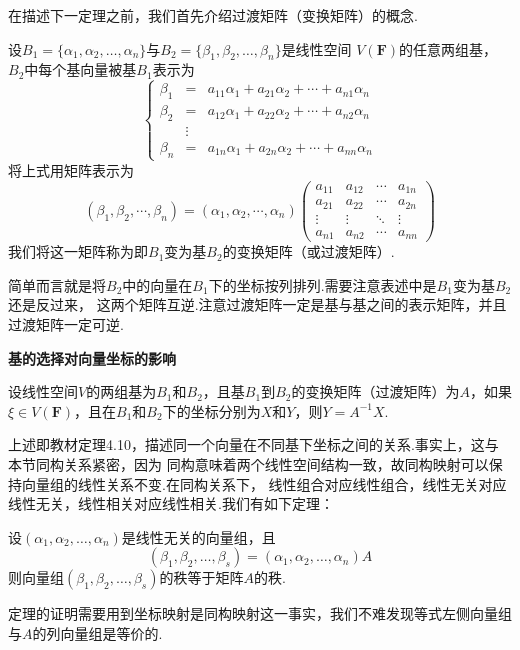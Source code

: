在描述下一定理之前，我们首先介绍过渡矩阵（变换矩阵）的概念.
\begin{definition}
    设$B_1=\{\alpha_1,\alpha_2,\ldots,\alpha_n\}$与$B_2=\{\beta_1,\beta_2,\ldots,\beta_n\}$是线性空间
    $V(\mathbf{F})$的任意两组基，$B_2$中每个基向量被基$B_1$表示为
    \[ \left\{
    \begin{array}{rcl}
        \beta_1&=&a_{11}\alpha_1+a_{21}\alpha_2+\cdots+a_{n1}\alpha_n \\
        \beta_2&=&a_{12}\alpha_1+a_{22}\alpha_2+\cdots+a_{n2}\alpha_n \\
        &\vdots& \\
        \beta_n&=&a_{1n}\alpha_1+a_{2n}\alpha_2+\cdots+a_{nn}\alpha_n
    \end{array}
    \right. \]
    将上式用矩阵表示为
    \[(\beta_1,\beta_2,\cdots,\beta_n)=(\alpha_1,\alpha_2,\cdots,\alpha_n)\begin{pmatrix}
        a_{11} & a_{12} & \cdots & a_{1n} \\
        a_{21} & a_{22} & \cdots & a_{2n} \\
        \vdots & \vdots & \ddots & \vdots \\
        a_{n1} & a_{n2} & \cdots & a_{nn}
    \end{pmatrix}\]
    我们将这一矩阵称为即$B_1$变为基$B_2$的变换矩阵（或过渡矩阵）.
\end{definition}
简单而言就是将$B_2$中的向量在$B_1$下的坐标按列排列.需要注意表述中是$B_1$变为基$B_2$还是反过来，
这两个矩阵互逆.注意过渡矩阵一定是基与基之间的表示矩阵，并且过渡矩阵一定可逆.
\begin{theorem}
    \textbf{\heiti 基的选择对向量坐标的影响}

    设线性空间$V$的两组基为$B_1$和$B_2$，且基$B_1$到$B_2$的变换矩阵（过渡矩阵）为$A$，如果
    $\xi \in V(\mathbf{F})$，且在$B_1$和$B_2$下的坐标分别为$X$和$Y$，则$Y=A^{-1}X$.
\end{theorem}
上述即教材定理4.10，描述同一个向量在不同基下坐标之间的关系.事实上，这与本节同构关系紧密，因为
同构意味着两个线性空间结构一致，故同构映射可以保持向量组的线性关系不变.在同构关系下，
线性组合对应线性组合，线性无关对应线性无关，线性相关对应线性相关.我们有如下定理：
\begin{theorem}
    设$(\alpha_1,\alpha_2,\ldots,\alpha_n)$是线性无关的向量组，且
    \[(\beta_1,\beta_2,\ldots,\beta_s)=(\alpha_1,\alpha_2,\ldots,\alpha_n)A\]
    则向量组$(\beta_1,\beta_2,\ldots,\beta_s)$的秩等于矩阵$A$的秩.
\end{theorem}
定理的证明需要用到坐标映射是同构映射这一事实，我们不难发现等式左侧向量组与$A$的列向量组是等价的.
